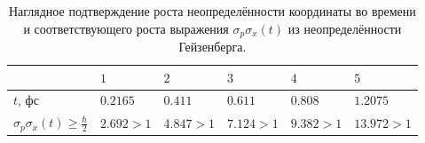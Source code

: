 \documentclass[12pt,a4paper]{article}
\begin{document}
\begin{center}
	\begin{table}[h]
		\noindent
		\begin{tabularx}{\textwidth}{|>{\centering\arraybackslash}X|>{\centering\arraybackslash}X|>{\centering\arraybackslash}X|>{\centering\arraybackslash}X|>{\centering\arraybackslash}X|>{\centering\arraybackslash}X|}
		\hline
		 & $1$ & $2$ & $3$ & $4$ & $5$ \\
		\hline
		$t$, фс & $0.2165$ & $0.411$ & $0.611$ & $0.808$ & $1.2075$ \\
		\hline
		$\sigma_p\sigma_x(t)\geq\frac{\hbar}{2}$ & $2.692>1$ & $4.847>1$ & $7.124>1$ & $9.382>1$ & $13.972>1$ \\
		\hline
		\end{tabularx}
		\caption{Наглядное подтверждение роста неопределённости координаты во времени
		и соответствующего роста выражения $\sigma_p\sigma_x(t)$ из неопределённости Гейзенберга.}
		\label{tab:lab2qmTask5part2}
	\end{table}
\end{center}
\end{document}
